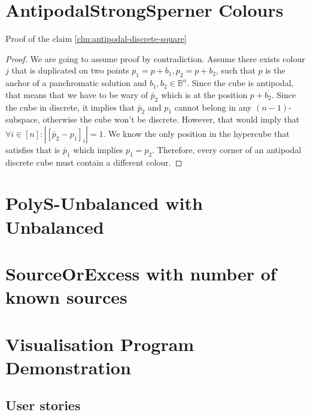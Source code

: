 \begin{appendices}

    \section*{AntipodalStrongSperner Colours}
    \label{antipodal-ss-proof}
    Proof of the claim \ref{clm:antipodal-discrete-square}
    \begin{proof}
        We are going to assume proof by contradiction. Assume there exists
        colour $j$ that is duplicated on two points $p_1 = p + b_1, p_2 = p + b_2$, such that
        $p$ is the anchor of a panchromatic solution and $b_1, b_2 \in \mathbb{B}^n$.
        Since the cube is antipodal, that means that we have to be wary of $\bar{p}_2$ which
        is at the position $p + \overline{b_2}$. Since the cube in discrete, it implies
        that $\bar{p}_2$ and $p_1$ cannot belong in any $(n-1)$-subspace, otherwise
        the cube won't be discrete. However, that would imply that $\forall i \in [n]: |[\bar{p}_2 - p_1]_i | = 1$. We know
        the only position in the hypercube that satisfies that is $\bar{p}_1$ which implies $p_1 = p_2$.
        Therefore, every corner of an antipodal discrete cube must contain a different colour.
    \end{proof}

    \section*{PolyS-Unbalanced with Unbalanced}
    \label{app:sec:polys-unbalanced-with-unbalanced}
    


    \section*{SourceOrExcess with number of known sources}
    \label{app:sec:sc-num-sol}
    


    \section*{Visualisation Program Demonstration}

    \subsection*{User stories}
    \label{app:user-stories}
    




\end{appendices}
